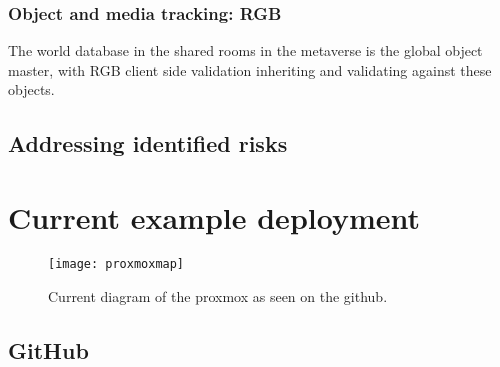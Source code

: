 \subsection{Object and media tracking: RGB}
The world database in the shared rooms in the metaverse is the global object master, with RGB client side validation inheriting and validating against these objects.\par
\section{Addressing identified risks}
\chapter{Current example deployment }
\lipsum[50]
\begin{figure*}[ht]\centering %
	\texttt{[image: proxmoxmap]}
	\caption{Current diagram of the proxmox as seen on the github.}
	\label{fig:proxmoxmap}
\end{figure*}
\section{GitHub }
\lipsum[50]